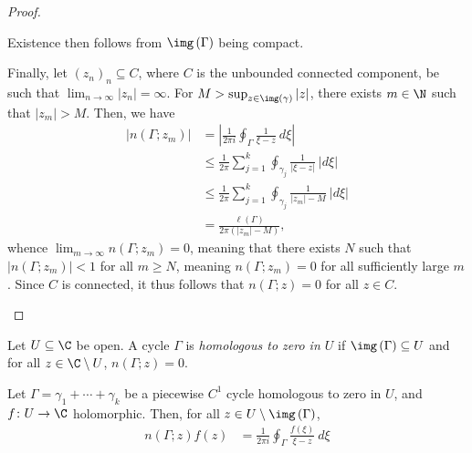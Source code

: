\documentclass[10pt]{mypackage}
\begin{document}
\begin{proof}
\begin{enumerate}[(i)]
      Existence then follows from $\img\left( \Gamma \right)$ being compact.\newline

      Finally, let $\left( z_n \right)_n\subseteq C$, where $C$ is the unbounded connected component, be such that $\lim_{n\rightarrow\infty} \left\vert z_n \right\vert = \infty$. For $M > \sup_{z\in\img\left( \gamma \right)}\left\vert z \right\vert$, there exists $m\in \N$ such that $\left\vert z_m \right\vert > M$. Then, we have
      \begin{align*}
        \left\vert n\left( \Gamma;z_m \right) \right\vert &= \left\vert \frac{1}{2\pi i} \oint_{\Gamma}^{} \frac{1}{\xi-z}\:d\xi \right\vert\\
                                                          &\leq \frac{1}{2\pi} \sum_{j=1}^{k} \oint_{\gamma_j}^{} \frac{1}{\left\vert \xi-z \right\vert}\:\left\vert d\xi \right\vert\\
                                                          &\leq \frac{1}{2\pi} \sum_{j=1}^{k} \oint_{\gamma_j}^{} \frac{1}{\left\vert z_m \right\vert - M}\:\left\vert d\xi \right\vert\\
                                                          &= \frac{\ell\left( \Gamma \right)}{2\pi \left( \left\vert z_m \right\vert - M \right)},
      \end{align*}
      whence $\lim_{m\rightarrow\infty} n\left( \Gamma;z_m \right) = 0$, meaning that there exists $N$ such that $\left\vert n\left( \Gamma;z_m \right) \right\vert < 1$ for all $m\geq N$, meaning $n\left( \Gamma;z_m \right) = 0$ for all sufficiently large $m$. Since $C$ is connected, it thus follows that $n\left( \Gamma;z \right) = 0$ for all $z\in C$.
  \end{enumerate}
\end{proof}
\begin{definition}
  Let $U\subseteq \C$ be open. A cycle $\Gamma$ is \textit{homologous to zero in $U$} if $\img\left( \Gamma \right)\subseteq U$ and for all $z\in \C\setminus U$, $n\left( \Gamma;z \right) = 0$.
\end{definition}
\begin{theorem}
  Let $\Gamma = \gamma_1 + \cdots + \gamma_k$ be a piecewise $C^1$ cycle homologous to zero in $U$, and $f\colon U\rightarrow \C$ holomorphic. Then, for all $z\in U\setminus \img\left( \Gamma \right)$,
  \begin{align*}
    n\left( \Gamma;z \right)f\left( z \right) &= \frac{1}{2\pi i} \oint_{\Gamma}^{} \frac{f\left( \xi \right)}{\xi - z}\:d\xi
  \end{align*}
\end{theorem}
\end{document}
